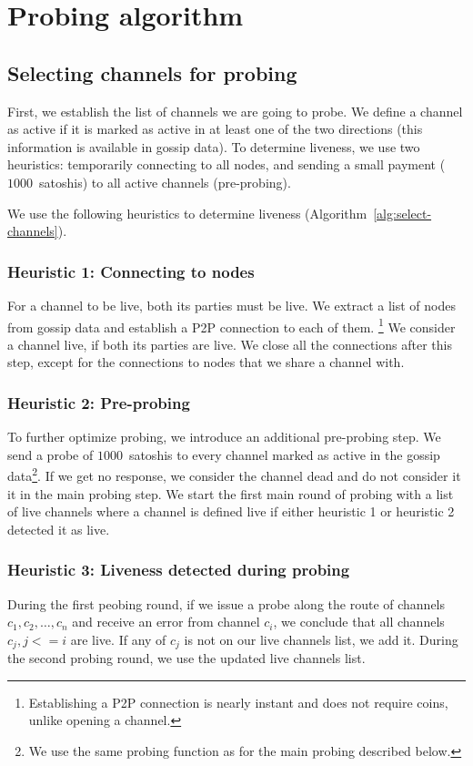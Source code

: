 \section{Probing algorithm}

\subsection{Selecting channels for probing}
First, we establish the list of channels we are going to probe.
We define a channel as active if it is marked as active in at least one of the two directions (this information is available in gossip data).
To determine liveness, we use two heuristics: temporarily connecting to all nodes, and sending a small payment ($1000$~satoshis) to all active channels (pre-probing).

We use the following heuristics to determine liveness (Algorithm~\ref{alg:select-channels}).

\subsubsection*{Heuristic 1: Connecting to nodes}
For a channel to be live, both its parties must be live.
We extract a list of nodes from gossip data and establish a P2P connection to each of them.
\footnote{Establishing a P2P connection is nearly instant and does not require coins, unlike opening a channel.}
We consider a channel live, if both its parties are live.
We close all the connections after this step, except for the connections to nodes that we share a channel with.

\subsubsection*{Heuristic 2: Pre-probing}
To further optimize probing, we introduce an additional pre-probing step.
We send a probe of $1000$~satoshis to every channel marked as active in the gossip data\footnote{We use the same probing function as for the main probing described below.}.
If we get no response, we consider the channel dead and do not consider it it in the main probing step.
We start the first main round of probing with a list of live channels where a channel is defined live if either heuristic 1 or heuristic 2 detected it as live.

\subsubsection*{Heuristic 3: Liveness detected during probing}
During the first peobing round, if we issue a probe along the route of channels $c_1, c_2, \dots, c_n$ and receive an error from channel $c_i$, we conclude that all channels $c_j, j<=i$ are live.
If any of $c_j$ is not on our live channels list, we add it.
During the second probing round, we use the updated live channels list.

